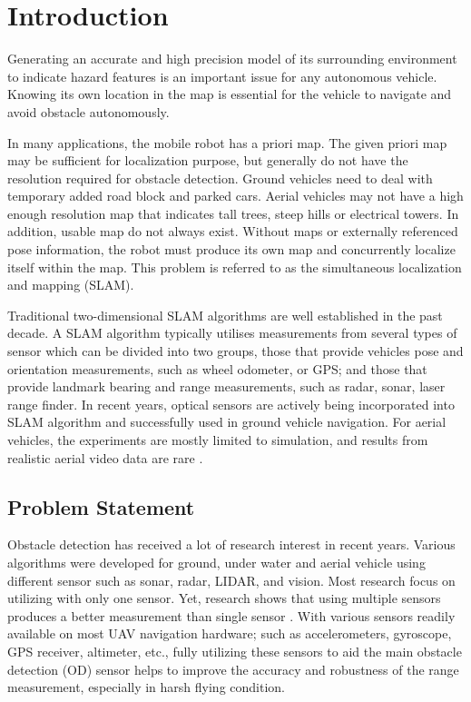 \chapter{Introduction} \label{ch:intro}

Generating an accurate and high precision model of its surrounding 
environment to indicate hazard features is an important issue for any 
autonomous vehicle. Knowing its own location in the map is essential for 
the vehicle to navigate and avoid obstacle autonomously. 

In many applications, the mobile robot has a priori map. The given 
priori map may be sufficient for localization purpose, but generally do 
not have the resolution required for obstacle detection. Ground vehicles 
need to deal with temporary added road block and parked cars. Aerial 
vehicles may not have a high enough resolution map that indicates tall 
trees, steep hills or electrical towers. In addition, usable map do not 
always exist. Without maps or externally referenced pose information, 
the robot must produce its own map and concurrently localize itself 
within the map. This problem is referred to as the simultaneous 
localization and mapping (SLAM). 

Traditional two-dimensional SLAM algorithms are well established in the past
decade. A SLAM algorithm typically utilises measurements from several
types of sensor which can be divided into two groups, those that
provide vehicles pose and orientation measurements, such as wheel
odometer, or GPS; and those that provide landmark bearing and range
measurements, such as radar, sonar, laser range finder. In recent
years, optical sensors are actively being incorporated into SLAM
algorithm and successfully used in ground vehicle navigation. For
aerial vehicles, the experiments are mostly limited to simulation, and
results from realistic aerial video data are rare \cite{nemra_robust_2010}
\cite{jianli_unscented_2011} \cite{sunderhauf_using_2007} \cite{artieda_visual_2009}.

\section{Problem Statement}\label{section:ProblemStatement}
Obstacle detection has received a lot of research interest in recent
years. Various algorithms were developed for ground, under water and
aerial vehicle using different sensor such as sonar, radar, LIDAR, and
vision. Most research focus on utilizing with only one sensor. Yet,
research shows that using multiple sensors produces a better
measurement than single sensor \cite{smith_approaches_2006}. With
various sensors readily available on most UAV navigation hardware;
such as accelerometers, gyroscope, GPS receiver, altimeter, etc.,
fully utilizing these sensors to aid the main obstacle detection (OD)
sensor helps to improve the accuracy and robustness of the range
measurement, especially in harsh flying condition.

